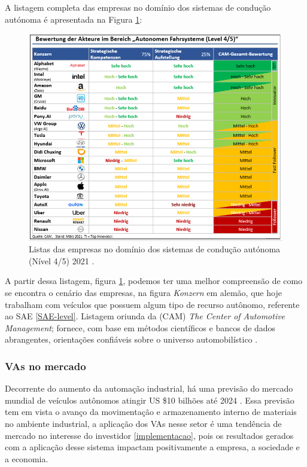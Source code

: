 A listagem completa das empresas no domínio dos sistemas de condução autónoma é apresentada na Figura \ref{figura_companies}:


\begin{figure}[H]
\centering
\includegraphics[width=16cm]{Figures/grafik.png}
\caption{Listas das empresas no domínio dos sistemas de condução autónoma (Nível 4/5) 2021 \cite{CAM}.}
\label{figura_companies}
\end{figure}

A partir dessa listagem, figura \ref{figura_companies}, podemos ter uma melhor compreensão de como se encontra o cenário das empresas, na figura \textit{Konzern} em alemão, que hoje trabalham com veículos que possuem algum tipo de recurso autônomo, referente ao SAE \ref{SAE-level}. Listagem oriunda da (CAM) \textit{The Center of Automotive Management}; fornece, com base em métodos científicos e bancos de dados abrangentes, orientações confiáveis sobre o universo automobilístico \cite{CAM}.

\subsubsection{VAs no mercado}

Decorrente do aumento da automação industrial, há uma previsão do mercado mundial de veículos autônomos atingir US \$10 bilhões até 2024 \cite{mercadoo}. Essa previsão tem em vista o avanço da movimentação e armazenamento interno de materiais no ambiente industrial, a aplicação dos VAs nesse setor é uma tendência de mercado no interesse do investidor \ref{implementacao}, pois os resultados gerados com a aplicação desse sistema impactam positivamente a empresa, a sociedade e a economia.

